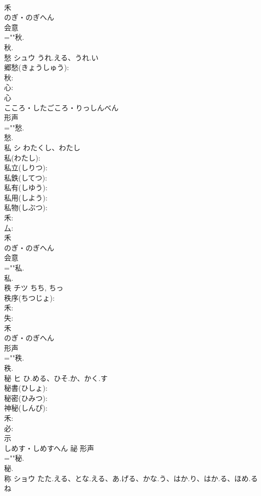 \documentclass[8pt]{extreport}
\begin{document}
\begin{CJK}{UTF8}{min}
\\	禾	
\\	のぎ・のぎへん	
\\	会意 
\\	=""秋.
\\	秋.
\\	愁	シュウ	うれ.える、うれ.い		
\\	郷愁(きょうしゅう): 
\\	秋: 
\\	心: 
\\	心	
\\	こころ・したごころ・りっしんべん	
\\	形声 
\\	=""愁.
\\	愁.
\\	私	シ	わたくし、わたし		
\\	私(わたし): 
\\	私立(しりつ): 
\\	私鉄(してつ): 
\\	私有(しゆう): 
\\	私用(しよう): 
\\	私物(しぶつ): 
\\	禾: 
\\	厶: 
\\	禾	
\\	のぎ・のぎへん	
\\	会意 
\\	=""私.
\\	私.
\\	秩	チツ		ちち, ちっ	
\\	秩序(ちつじょ): 
\\	禾: 
\\	失: 
\\	禾	
\\	のぎ・のぎへん	
\\	形声 
\\	=""秩.
\\	秩.
\\	秘	ヒ	ひ.める、ひそ.か、かく.す		
\\	秘書(ひしょ): 
\\	秘密(ひみつ): 
\\	神秘(しんぴ): 
\\	禾: 
\\	必: 
\\	示	
\\	しめす・しめすへん	祕	形声 
\\	=""秘.
\\	秘.
\\	称	ショウ	たた.える、とな.える、あ.げる、かな.う、はか.り、はか.る、ほめ.る	ね	

\end{CJK}
\end{document}
